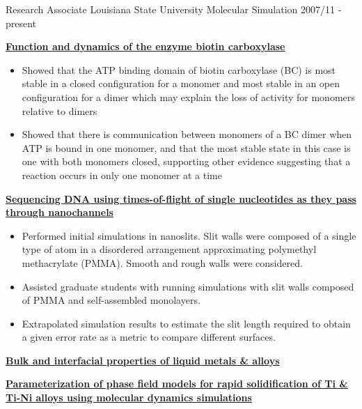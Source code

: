 \pagebreak


\begin{cventries}
  \cventry
    {Research Associate} %
    {Louisiana State University} %
    {Molecular Simulation} %
    {2007/11 - present} %
    {
        \begin{cvitems} %
            \item {\textbf{\underline{Function and dynamics of the enzyme biotin carboxylase}}}
                \begin{itemize}
                \item {Showed that the ATP binding domain of biotin carboxylase (BC) is most stable in a closed configuration for a monomer and most stable in an open configuration for a dimer which may explain the loss of activity for monomers relative to dimers}
                \item {Showed that there is communication between monomers of a BC dimer when ATP is bound in one monomer, and that the most stable state in this case is one with both monomers closed, supporting other evidence suggesting that a reaction occurs in only one monomer at a time}
                \end{itemize}
            \item {\textbf{\underline{Sequencing DNA using times-of-flight of single nucleotides as they pass through nanochannels}}}
                \begin{itemize}
                \item {Performed initial simulations in nanoslits. Slit walls were composed of a single type of atom in a disordered arrangement approximating polymethyl methacrylate (PMMA). Smooth and rough walls were considered.}
                \item {Assisted graduate students with running simulations with slit walls composed of PMMA and self-assembled monolayers.}
                \item {Extrapolated simulation results to estimate the slit length required to obtain a given error rate as a metric to compare different surfaces.}
                \end{itemize}        
            \item {\textbf{\underline{Bulk and interfacial properties of liquid metals \& alloys}}}
            \item {\textbf{\underline{Parameterization of phase field models for rapid solidification of Ti \& Ti-Ni alloys using molecular dynamics simulations}}}

\end{cvitems}}
\end{cventries}
